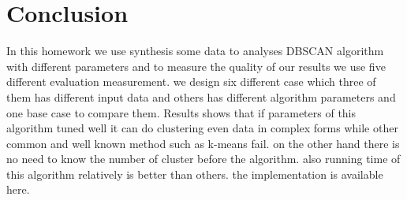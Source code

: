 \section{Conclusion}
In this homework we use synthesis some data to analyses DBSCAN algorithm with different parameters and to measure the quality of our results we use five different evaluation measurement. we design six different case which three of them has different input data and others has different algorithm parameters and one base case to compare them.
\newline
Results shows that if parameters of this algorithm tuned well it can do clustering even data in complex forms while other common and well known method such as k-means fail. on the other hand there is no need to know the number of cluster before the algorithm. also running time of this algorithm relatively is better than others. the implementation is available here\cite{github:HW4}.  